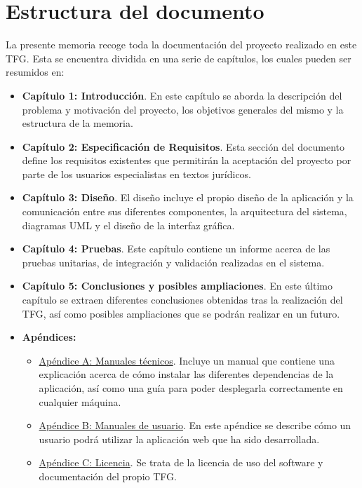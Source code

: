 \section{Estructura del documento}
La presente memoria recoge toda la documentación del proyecto realizado en este TFG. Esta se encuentra dividida en una serie de capítulos, los cuales pueden ser resumidos en:
\begin{itemize}
\item {\bf Capítulo 1: Introducción}. En este capítulo se aborda la descripción del problema y motivación del proyecto, los objetivos generales del mismo y la estructura de la memoria.
\item {\bf Capítulo 2: Especificación de Requisitos}. Esta sección del documento define los requisitos existentes que permitirán  la aceptación del proyecto por parte de los usuarios especialistas en textos jurídicos.
\item {\bf Capítulo 3: Diseño}. El diseño incluye el propio diseño de la aplicación y la comunicación entre sus diferentes componentes, la arquitectura del sistema, diagramas UML y el diseño de la interfaz gráfica.
\item {\bf Capítulo 4: Pruebas}. Este capítulo contiene un informe acerca de las pruebas unitarias, de integración y validación realizadas en el sistema.
\item {\bf Capítulo 5: Conclusiones y posibles ampliaciones}. En este último capítulo se extraen diferentes conclusiones obtenidas tras la realización del TFG, así como posibles ampliaciones que se podrán realizar en un futuro.
\item {\bf Apéndices:}
\begin{itemize}
\item \underline{Apéndice A: Manuales técnicos}. Incluye un manual que contiene una explicación acerca de cómo instalar las diferentes dependencias de la aplicación, así como una guía para poder desplegarla correctamente en cualquier máquina.
\item \underline{Apéndice B: Manuales de usuario}. En este apéndice se describe cómo un usuario podrá utilizar la aplicación web que ha sido desarrollada.
\item \underline{Apéndice C: Licencia}. Se trata de la licencia de uso del software y documentación del propio TFG.
\end{itemize}
\end{itemize}